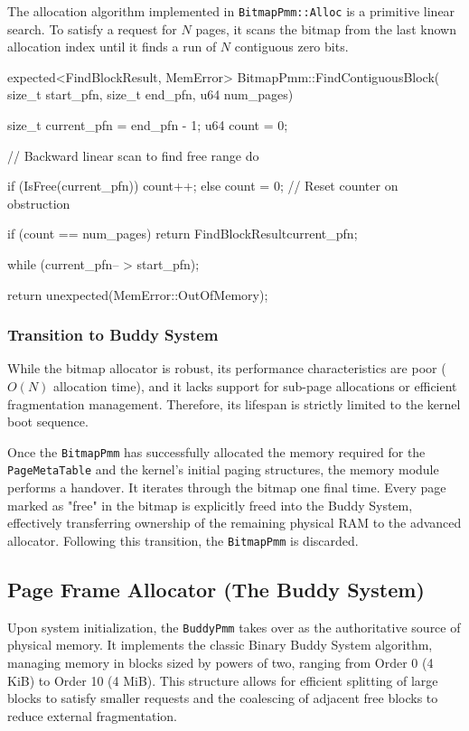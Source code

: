 \documentclass[a4paper,10pt,twoside]{report}
\theoremstyle{definition}
\begin{document}
The allocation algorithm implemented in \texttt{BitmapPmm::Alloc} is a primitive linear search. To satisfy a request for $N$ pages, it scans the bitmap from the last known allocation index until it finds a run of $N$ contiguous zero bits.

\clearpage

\begin{cppcode}[caption={Bootstrap Linear Allocation Logic}, label={lst:bitmap_alloc}]
expected<FindBlockResult, MemError> BitmapPmm::FindContiguousBlock(
    size_t start_pfn, size_t end_pfn, u64 num_pages)
{
    size_t current_pfn = end_pfn - 1;
    u64 count = 0;

    // Backward linear scan to find free range
    do {
        if (IsFree(current_pfn)) {
            count++;
        } else {
            count = 0; // Reset counter on obstruction
        }

        if (count == num_pages) {
            return FindBlockResult{current_pfn};
        }
    } while (current_pfn-- > start_pfn);

    return unexpected(MemError::OutOfMemory);
}
\end{cppcode}

\subsubsection{Transition to Buddy System}
While the bitmap allocator is robust, its performance characteristics are poor ($O(N)$ allocation time), and it lacks support for sub-page allocations or efficient fragmentation management. Therefore, its lifespan is strictly limited to the kernel boot sequence.

Once the \texttt{BitmapPmm} has successfully allocated the memory required for the \texttt{PageMetaTable} and the kernel's initial paging structures, the memory module performs a handover. It iterates through the bitmap one final time. Every page marked as "free" in the bitmap is explicitly freed into the Buddy System, effectively transferring ownership of the remaining physical RAM to the advanced allocator. Following this transition, the \texttt{BitmapPmm} is discarded.

\subsection{Page Frame Allocator (The Buddy System)}

Upon system initialization, the \texttt{BuddyPmm} takes over as the authoritative source of physical memory. It implements the classic Binary Buddy System algorithm, managing memory in blocks sized by powers of two, ranging from Order 0 (4 KiB) to Order 10 (4 MiB). This structure allows for efficient splitting of large blocks to satisfy smaller requests and the coalescing of adjacent free blocks to reduce external fragmentation.
\end{document}
